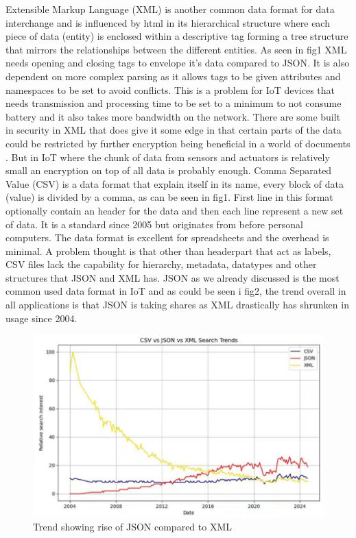 \documentclass[article,a4paper]{IEEEtran}
\begin{document}
Extensible Markup Language (XML) \cite{XMLdocs} is another common data format for data interchange and is influenced by html in its hierarchical structure where each piece of data (entity) is enclosed within a descriptive tag forming a tree structure that mirrors the relationships between the different entities. As seen in fig1 XML needs opening and closing tags to envelope it's data compared to JSON. It is also dependent on more complex parsing as it allows tags to be given attributes and namespaces to be set to avoid conflicts. This is a problem for IoT devices that needs transmission and processing time to be set to a minimum to not consume battery and it also takes more bandwidth on the network. There are some built in security in XML that does give it some edge in that certain parts of the data could be restricted by further encryption being beneficial in a world of documents \cite{XMLSecurity}. But in IoT where the chunk of data from sensors and actuators is relatively small an encryption on top of all data is probably enough.    
\newline\newline
Comma Separated Value (CSV) \cite{CSVdocs} is a data format that explain itself in its name, every block of data (value) is divided by a comma, as can be seen in fig1. First line in this format optionally contain an header for the data and then each line represent a new set of data. It is a standard since 2005 but originates from before personal computers. The data format is excellent for spreadsheets and the overhead is minimal. A problem thought is that other than headerpart that act as labels, CSV files lack the capability for hierarchy, metadata, datatypes and other structures that JSON and XML has. 
\newline\newline
JSON as we already discussed is the most common used data format in IoT and as could be seen i fig2, the trend overall in all applications is that JSON is taking shares as XML drastically has shrunken in usage since 2004.  
\begin{figure}
    \includegraphics[width=\columnwidth]{DataFormatTrend.png} 
    \caption{ Trend showing rise of JSON compared to XML \cite{CompareJSONXMLCSV} }
    \label{fig2: Trend XML CSV JSON }   
\end{figure}
\end{document}

